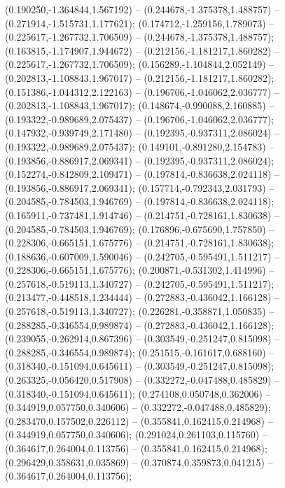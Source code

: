  (0.190250,-1.364844,1.567192) -- (0.244678,-1.375378,1.488757) -- (0.271914,-1.515731,1.177621);
 (0.174712,-1.259156,1.789073) -- (0.225617,-1.267732,1.706509) -- (0.244678,-1.375378,1.488757);
 (0.163815,-1.174907,1.944672) -- (0.212156,-1.181217,1.860282) -- (0.225617,-1.267732,1.706509);
 (0.156289,-1.104844,2.052149) -- (0.202813,-1.108843,1.967017) -- (0.212156,-1.181217,1.860282);
 (0.151386,-1.044312,2.122163) -- (0.196706,-1.046062,2.036777) -- (0.202813,-1.108843,1.967017);
 (0.148674,-0.990088,2.160885) -- (0.193322,-0.989689,2.075437) -- (0.196706,-1.046062,2.036777);
 (0.147932,-0.939749,2.171480) -- (0.192395,-0.937311,2.086024) -- (0.193322,-0.989689,2.075437);
 (0.149101,-0.891280,2.154783) -- (0.193856,-0.886917,2.069341) -- (0.192395,-0.937311,2.086024);
 (0.152274,-0.842809,2.109471) -- (0.197814,-0.836638,2.024118) -- (0.193856,-0.886917,2.069341);
 (0.157714,-0.792343,2.031793) -- (0.204585,-0.784503,1.946769) -- (0.197814,-0.836638,2.024118);
 (0.165911,-0.737481,1.914746) -- (0.214751,-0.728161,1.830638) -- (0.204585,-0.784503,1.946769);
 (0.176896,-0.675690,1.757850) -- (0.228306,-0.665151,1.675776) -- (0.214751,-0.728161,1.830638);
 (0.188636,-0.607009,1.590046) -- (0.242705,-0.595491,1.511217) -- (0.228306,-0.665151,1.675776);
 (0.200871,-0.531302,1.414996) -- (0.257618,-0.519113,1.340727) -- (0.242705,-0.595491,1.511217);
 (0.213477,-0.448518,1.234444) -- (0.272883,-0.436042,1.166128) -- (0.257618,-0.519113,1.340727);
 (0.226281,-0.358871,1.050835) -- (0.288285,-0.346554,0.989874) -- (0.272883,-0.436042,1.166128);
 (0.239055,-0.262914,0.867396) -- (0.303549,-0.251247,0.815098) -- (0.288285,-0.346554,0.989874);
 (0.251515,-0.161617,0.688160) -- (0.318340,-0.151094,0.645611) -- (0.303549,-0.251247,0.815098);
 (0.263325,-0.056420,0.517908) -- (0.332272,-0.047488,0.485829) -- (0.318340,-0.151094,0.645611);
 (0.274108,0.050748,0.362006) -- (0.344919,0.057750,0.340606) -- (0.332272,-0.047488,0.485829);
 (0.283470,0.157502,0.226112) -- (0.355841,0.162415,0.214968) -- (0.344919,0.057750,0.340606);
 (0.291024,0.261103,0.115760) -- (0.364617,0.264004,0.113756) -- (0.355841,0.162415,0.214968);
 (0.296429,0.358631,0.035869) -- (0.370874,0.359873,0.041215) -- (0.364617,0.264004,0.113756);
